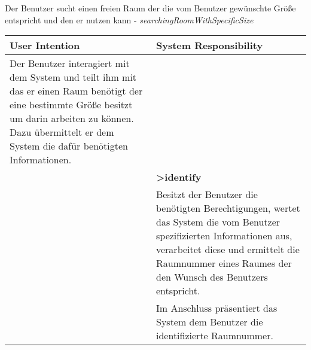 \begin{table}[h]
	Der Benutzer sucht einen freien Raum der die vom Benutzer gewünschte Größe entspricht und den er nutzen kann - \textit{searchingRoomWithSpecificSize}\\
	\begin{tabularx}{\textwidth}{|X|X|}
	\rowcolor{heading} \textbf{User Intention} & \textbf{System Responsibility}\\ \hline
	Der Benutzer interagiert mit dem System und teilt ihm mit das er einen Raum benötigt der eine bestimmte Größe besitzt um darin arbeiten zu können. Dazu übermittelt er dem System die dafür benötigten Informationen. & \\  \hline
	 & \textbf{>identify} \\ \hline
	 & Besitzt der Benutzer die benötigten Berechtigungen, wertet das System die vom Benutzer spezifizierten Informationen aus, verarbeitet diese und ermittelt die Raumnummer eines Raumes der den Wunsch des Benutzers entspricht.\\ \hline
	 & Im Anschluss präsentiert das System dem Benutzer die identifizierte Raumnummer.\\ \hline
	\end{tabularx}
\end{table}

